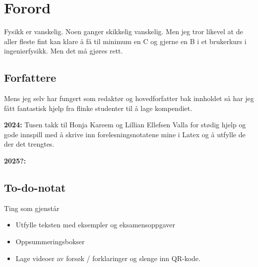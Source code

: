 \documentclass[../Main.tex]{subfiles}
\begin{document}
\chapter*{Forord}
Fysikk er vanskelig. Noen ganger skikkelig vanskelig. Men jeg tror likevel at de aller fleste fint kan klare å få til minimum en C og gjerne en B i et brukerkurs i ingeniørfysikk.
Men det må gjøres rett.

\section*{Forfattere}
Mens jeg selv har fungert som redaktør og hovedforfatter bak innholdet så har jeg fått fantastisk hjelp fra flinke studenter til å lage kompendiet.

\textbf{2024:} Tusen takk til Honja Kareem og Lillian Ellefsen Valla for stødig hjelp og gode innspill med å skrive inn forelesningsnotatene mine i Latex og å utfylle de der det trengtes.

\textbf{2025?:}

\section{To-do-notat}
Ting som gjenstår
\begin{itemize}
    \item Utfylle teksten med eksempler og eksamensoppgaver
    \item Oppsummeringsbokser
    \item Lage videoer av forsøk / forklaringer og slenge inn QR-kode.
\end{itemize}
\end{document}
